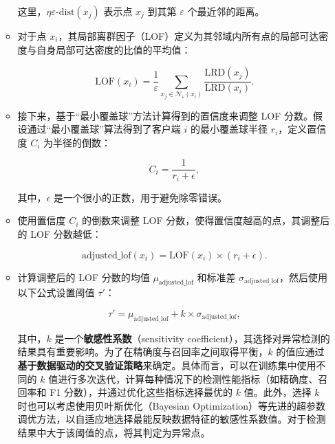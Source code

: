 \documentclass[lettersize,journal]{IEEEtran}
\begin{document}
\begin{enumerate}
\begin{itemize}
    这里，\(\eta\varepsilon\text{-dist}(x_j)\) 表示点 \(x_j\) 到其第 \(\varepsilon\) 个最近邻的距离。

    \item 对于点 \(x_i\)，其局部离群因子（LOF）定义为其邻域内所有点的局部可达密度与自身局部可达密度的比值的平均值：

    \begin{equation}
    \text{LOF}(x_i) = \frac{1}{\varepsilon} \sum_{x_j \in \mathcal{N}_\varepsilon(x_i)} \frac{\text{LRD}(x_j)}{\text{LRD}(x_i)}.
    \end{equation}

    \item 接下来，基于“最小覆盖球”方法计算得到的置信度来调整 LOF 分数。假设通过“最小覆盖球”算法得到了客户端 \(i\) 的最小覆盖球半径 \(r_i\)，定义置信度 \(C_i\) 为半径的倒数：

    \begin{equation}
    C_i = \frac{1}{r_i + \epsilon},
    \end{equation}

    其中，\(\epsilon\) 是一个很小的正数，用于避免除零错误。

    \item 使用置信度 \(C_i\) 的倒数来调整 LOF 分数，使得置信度越高的点，其调整后的 LOF 分数越低：

    \begin{equation}
    \text{adjusted\_lof}(x_i) = \text{LOF}(x_i) \times (r_i + \epsilon).
    \end{equation}

    \item 计算调整后的 LOF 分数的均值 \(\mu_{\text{adjusted\_lof}}\) 和标准差 \(\sigma_{\text{adjusted\_lof}}\)，然后使用以下公式设置阈值 \(\tau'\)：

    \begin{equation}
    \tau' = \mu_{\text{adjusted\_lof}} + k \times \sigma_{\text{adjusted\_lof}},
    \end{equation}

    其中，\(k\) 是一个\textbf{敏感性系数}（sensitivity coefficient），其选择对异常检测的结果具有重要影响。为了在精确度与召回率之间取得平衡，\(k\) 的值应通过\textbf{基于数据驱动的交叉验证策略}来确定。具体而言，可以在训练集中使用不同的 \(k\) 值进行多次迭代，计算每种情况下的检测性能指标（如精确度、召回率和 F1 分数），并通过优化这些指标选择最优的 \(k\) 值。此外，选择 \(k\) 时也可以考虑使用贝叶斯优化（Bayesian Optimization）等先进的超参数调优方法，以自适应地选择最能反映数据特征的敏感性系数值。对于检测结果中大于该阈值的点，将其判定为异常点。
\end{itemize}



\end{enumerate}
\end{document}
